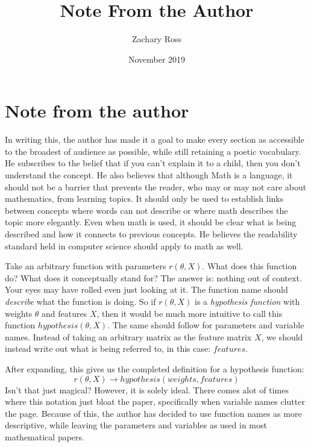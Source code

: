 \documentclass{book}[a5paper]
\title{Note From the Author}
\author{Zachary Ross}
\date{November 2019}
\begin{document}
\chapter{Note from the author}

In writing this, the author has made it a goal to make every section as accessible to the broadest of audience as possible, while still retaining a poetic vocabulary. He subscribes to the belief that if you can't explain it to a child, then you don't understand the concept. He also believes that although Math is a language, it should not be a barrier that prevents the reader, who may or may not care about mathematics, from learning topics. It should only be used to establish  links between concepts where words can not describe or where math describes the topic more elegantly. Even when math is used, it should be clear what is being described and how it connects to previous concepts. He believes the readability standard held in computer science should apply to math as well.

Take an arbitrary function with parameters $r(\theta, X)$. What does this function do? What does it conceptually stand for? The answer is: nothing out of context. Your eyes may have rolled even just looking at it. The function name should \emph{describe} what the function is doing. So if $r(\theta, X)$ is a \emph{hypothesis function} with weights $\theta$ and features $X$, then it would be much more intuitive to call this function $hypothesis(\theta, X)$. The same should follow for parameters and variable names. Instead of taking an arbitrary matrix as the feature matrix $X$, we should instead write out what is being referred to, in this case: $features$.

After expanding, this gives us the completed definition for a hypothesis function:
\begin{equation}
    r(\theta, X) \rightarrow hypothesis(weights, features)
\end{equation}
Isn't that just magical? However, it is solely ideal. There comes alot of times where this notation just bloat the paper, specifically when variable names clutter the page. Because of this, the author has decided to use function names as more descriptive, while leaving the parameters and variables as used in most mathematical papers.
\end{document}
